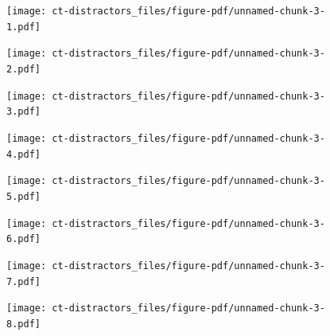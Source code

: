 \documentclass[
  letterpaper,
  DIV=11,
  numbers=noendperiod]{scrreprt}
\begin{document}
\begin{figure}[H]

{\centering \texttt{[image: ct-distractors\_files/figure-pdf/unnamed-chunk-3-1.pdf]}

}

\end{figure}

\begin{figure}[H]

{\centering \texttt{[image: ct-distractors\_files/figure-pdf/unnamed-chunk-3-2.pdf]}

}

\end{figure}

\begin{figure}[H]

{\centering \texttt{[image: ct-distractors\_files/figure-pdf/unnamed-chunk-3-3.pdf]}

}

\end{figure}

\begin{figure}[H]

{\centering \texttt{[image: ct-distractors\_files/figure-pdf/unnamed-chunk-3-4.pdf]}

}

\end{figure}

\begin{figure}[H]

{\centering \texttt{[image: ct-distractors\_files/figure-pdf/unnamed-chunk-3-5.pdf]}

}

\end{figure}

\begin{figure}[H]

{\centering \texttt{[image: ct-distractors\_files/figure-pdf/unnamed-chunk-3-6.pdf]}

}

\end{figure}

\begin{figure}[H]

{\centering \texttt{[image: ct-distractors\_files/figure-pdf/unnamed-chunk-3-7.pdf]}

}

\end{figure}

\begin{figure}[H]

{\centering \texttt{[image: ct-distractors\_files/figure-pdf/unnamed-chunk-3-8.pdf]}

}

\end{figure}
\end{document}

